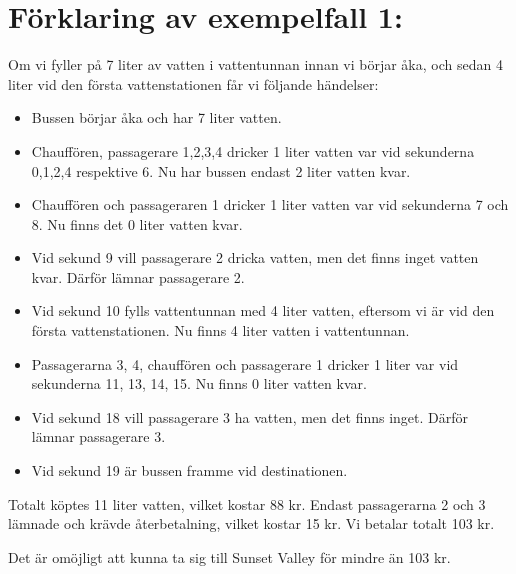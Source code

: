 \section*{Förklaring av exempelfall 1:}
Om vi fyller på 7 liter av vatten i vattentunnan innan vi börjar åka, och sedan 4 liter vid den första vattenstationen får vi följande händelser:

\begin{itemize}
  \item Bussen börjar åka och har 7 liter vatten.
  \item Chauffören, passagerare 1,2,3,4 dricker 1 liter vatten var vid sekunderna 0,1,2,4 respektive 6. Nu har bussen endast 2 liter vatten kvar.
  \item Chauffören och passageraren 1 dricker 1 liter vatten var vid sekunderna 7 och 8. Nu finns det 0 liter vatten kvar.
  \item Vid sekund 9 vill passagerare 2 dricka vatten, men det finns inget vatten kvar. Därför lämnar passagerare 2.
  \item Vid sekund 10 fylls vattentunnan med 4 liter vatten, eftersom vi är vid den första vattenstationen. Nu finns 4 liter vatten i vattentunnan.
  \item Passagerarna 3, 4, chauffören och passagerare 1 dricker 1 liter var vid sekunderna 11, 13, 14, 15. Nu finns 0 liter vatten kvar.
  \item Vid sekund 18 vill passagerare 3 ha vatten, men det finns inget. Därför lämnar passagerare 3.
  \item Vid sekund 19 är bussen framme vid destinationen.
\end{itemize}

Totalt köptes 11 liter vatten, vilket kostar 88 kr. Endast passagerarna 2 och 3 lämnade och krävde återbetalning, vilket kostar 15 kr.
Vi betalar totalt 103 kr.

Det är omöjligt att kunna ta sig till Sunset Valley för mindre än 103 kr. 

